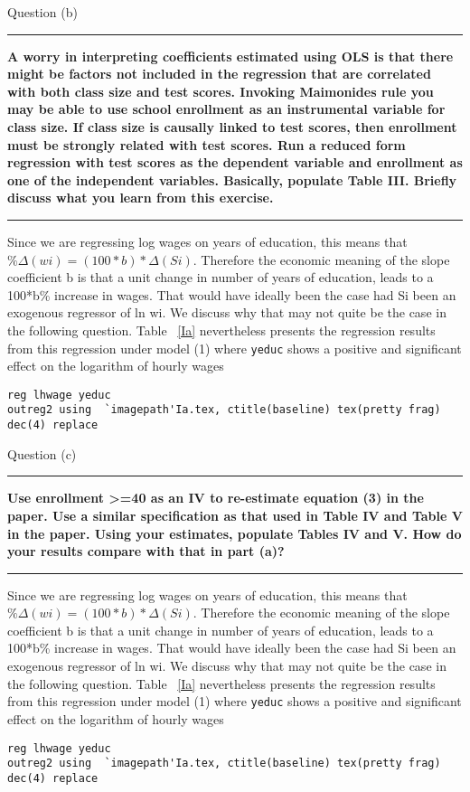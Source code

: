 \documentclass[12pt]{article}
\newcommand\question[1]{\vspace{1em}\hrule\vspace{1em}\textbf{#1}\vspace{1em}\hrule\vspace{1em}}
\begin{document}
\newpage
\begin{center}\LARGE{Question (b)}\end{center}
\question{A worry in interpreting coefficients estimated using OLS is that there might be factors not included in the regression that are correlated with both class size and test scores. Invoking Maimonides rule you may be able to use school enrollment as an instrumental variable for class size. If class size is causally linked to test scores, then enrollment must be strongly related with test scores. Run a reduced form regression with test scores as the dependent variable and enrollment as one of the independent variables. Basically, populate Table III. Briefly discuss what you learn from this exercise. }
Since we are regressing log wages on years of education, this means that $\%\Delta(wi) = (100*b)*\Delta(Si)$. Therefore the  economic meaning of the slope coefficient b is that a unit change in number of years of education, leads to a 100*b\% increase in wages. That would have ideally been the case had Si been an exogenous regressor of ln wi. We discuss why that may not quite be the case in the following question. Table ~\ref{Ia} nevertheless presents the regression  results from this regression under model (1) where \verb|yeduc| shows a positive and significant effect on the logarithm of hourly wages
\begin{lstlisting}
reg lhwage yeduc
outreg2 using  `imagepath'Ia.tex, ctitle(baseline) tex(pretty frag) dec(4) replace
\end{lstlisting}

\newpage
\begin{center}\LARGE{Question (c)}\end{center}
\question{Use enrollment >=40 as an IV to re-estimate equation (3) in the paper. Use a similar specification as that used in Table IV and Table V in the paper. Using your estimates, populate Tables IV and V. How do your results compare with that in part (a)?}
Since we are regressing log wages on years of education, this means that $\%\Delta(wi) = (100*b)*\Delta(Si)$. Therefore the  economic meaning of the slope coefficient b is that a unit change in number of years of education, leads to a 100*b\% increase in wages. That would have ideally been the case had Si been an exogenous regressor of ln wi. We discuss why that may not quite be the case in the following question. Table ~\ref{Ia} nevertheless presents the regression  results from this regression under model (1) where \verb|yeduc| shows a positive and significant effect on the logarithm of hourly wages
\begin{lstlisting}
reg lhwage yeduc
outreg2 using  `imagepath'Ia.tex, ctitle(baseline) tex(pretty frag) dec(4) replace
\end{lstlisting}
\end{document}

